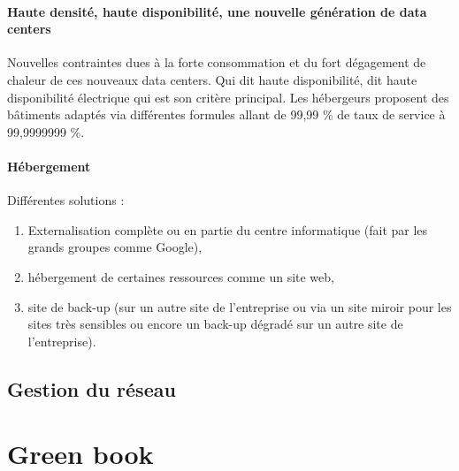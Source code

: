 \documentclass[10pt,a4paper,oneside,titlepage]{report}
\begin{document}
\begin{sffamily}
\subsubsection{Haute densité, haute disponibilité, une nouvelle génération de data centers}

Nouvelles contraintes dues à la forte consommation et du fort dégagement de chaleur de ces nouveaux data centers. Qui dit haute disponibilité, dit haute disponibilité électrique qui est son critère principal. Les hébergeurs proposent des b\^atiments adaptés via différentes formules allant de 99,99 \% de taux de service à 99,9999999 \%.

\subsubsection{Hébergement}

Différentes solutions :\begin{enumerate}
\item Externalisation complète ou en partie du centre informatique (fait par les grands groupes comme Google),
\item hébergement de certaines ressources comme un site web,
\item site de back-up (sur un autre site de l'entreprise ou via un site miroir pour les sites très sensibles ou encore un back-up dégradé sur un autre site de l'entreprise).
\end{enumerate}

\section{Gestion du réseau}



\chapter{Green book}

\end{sffamily} 
\end{document}
